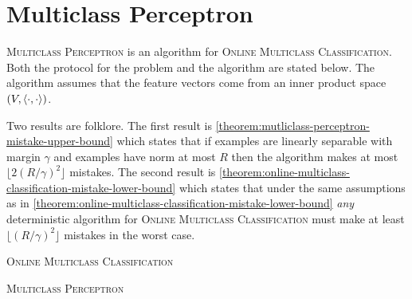 \section{Multiclass Perceptron}
\label{section:multiclass-perceptron-proofs}

\textsc{Multiclass Perceptron} is an algorithm for \textsc{Online Multiclass
Classification}. Both the protocol for the problem and the algorithm are stated
below. The algorithm assumes that the feature vectors come from an inner product
space $(V, \left\langle \cdot, \cdot \right\rangle)$.

Two results are folklore. The first result is
\autoref{theorem:mutliclass-perceptron-mistake-upper-bound} which states that if
examples are linearly separable with margin $\gamma$ and examples have norm
at most $R$ then the algorithm makes at most $\lfloor 2 (R/\gamma)^2 \rfloor$
mistakes. The second result is
\autoref{theorem:online-multiclass-classification-mistake-lower-bound} which
states that under the same assumptions as in
\autoref{theorem:online-multiclass-classification-mistake-lower-bound}
\emph{any} deterministic algorithm for \textsc{Online Multiclass Classification}
must make at least $\lfloor (R/\gamma)^2 \rfloor$ mistakes in the worst case.

\begin{algorithm}[h]
\caption{\textsc{Online Multiclass Classification}
\label{algorithm:mutliclass-classification}}
\begin{algorithmic}[1]
{
\ENDFOR
}
\end{algorithmic}
\end{algorithm}

\begin{algorithm}[h]
\caption{\textsc{Multiclass Perceptron}
\label{algorithm:mutliclass-perceptron}}
\begin{algorithmic}[1]
{
\ELSE
{}
\ENDIF
\ENDFOR
}
\end{algorithmic}
\end{algorithm}

